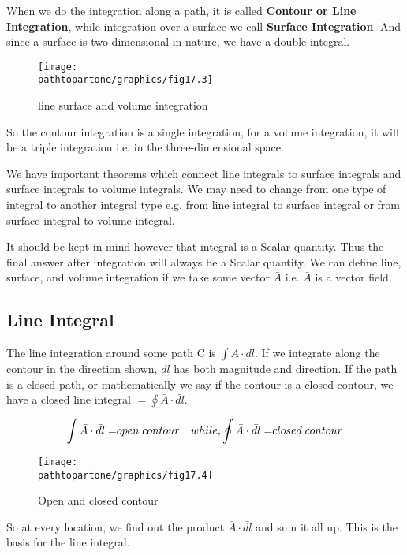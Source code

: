 When we do the integration along a path, it is called \textbf{Contour or Line Integration}, while integration over a surface we call \textbf{Surface Integration}. And since a surface is two-dimensional in nature, we have a double integral.
\begin{figure}[h]
\centering
\texttt{[image: \\pathtopartone/graphics/fig17.3]}
\caption{line surface and volume integration}
\end{figure}

So the contour integration is a single integration, for a volume integration, it will be a triple integration i.e. in the three-dimensional space.

We have important theorems which connect line integrals to surface integrals and surface integrals to volume integrals. We may need to change from one type of integral to another integral type e.g. from line integral to surface integral or from surface integral to volume integral.

It should be kept in mind however that integral is a Scalar quantity. Thus the final answer after integration will always be a Scalar quantity. We can define line, surface, and volume integration if we take some vector $\bar{A}$ i.e. $\bar{A}$ is a vector field. 

\subsection{Line Integral}
The line integration around some path C is ${\displaystyle \int  \bar{A} \cdot \bar{dl}}$. If we integrate along the contour in the direction shown, $dl$ has both magnitude and direction. If the path is a closed path, or mathematically we say if the contour is a closed contour, we have a closed line integral $= {\displaystyle \oint  \bar{A} \cdot \bar{dl}}$.

\begin{equation}
{\displaystyle \int  \bar{A} \cdot \bar{dl} = }open\; contour\quad while, \newline  {\displaystyle \oint  \bar{A} \cdot \bar{dl}= }closed\; contour
\end{equation}
\begin{figure}
\centering
\texttt{[image: \\pathtopartone/graphics/fig17.4]}
\caption{Open and closed contour}
\end{figure}

So at every location, we find out the product $\bar{A} \cdot \bar{dl}$ and sum it all up. This is the basis for the line integral.

